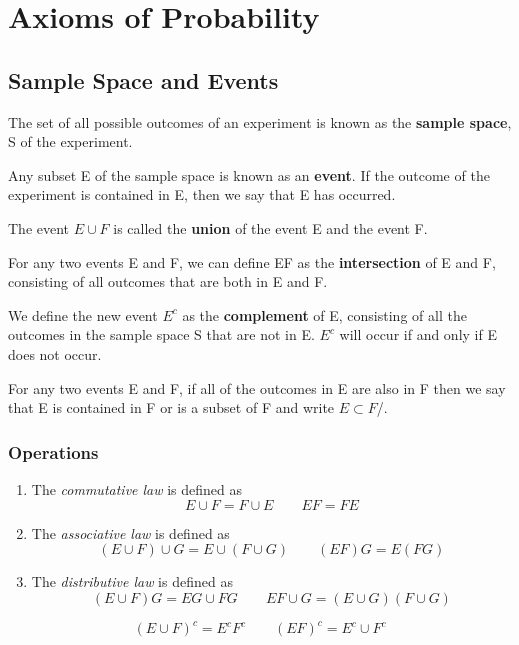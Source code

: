 \setcounter{chapter}{1}
\chapter{Axioms of Probability}
\section{Sample Space and Events}
\begin{definition}
The set of all possible outcomes of an experiment is known as the \textbf{sample space}, S of the experiment.
\end{definition}
\begin{definition}[Event]
Any subset E of the sample space is known as an \textbf{event}. If the outcome of the experiment is contained in E, then we say that E has occurred. 
\end{definition}
\begin{definition}[Union]
The event $E\cup F$ is called the \textbf{union} of the event E and the event F.
\end{definition}
\begin{definition}[Intersection]
    For any two events E and F, we can define EF as the \textbf{intersection} of E and F, consisting of all outcomes that are both in E and F.
\end{definition}
\begin{definition}[Complement]
    We define the new event $E^c$ as the \textbf{complement} of E, consisting of all the outcomes in the sample space S that are not in E. $E^c$ will occur if and only if E does not occur. 
\end{definition}
\begin{definition}
    For any two events E and F, if all of the outcomes in E are also in F then we say that E is contained in F or is a subset of F and write $E\subset F$/.
\end{definition}
\subsection{Operations}
\begin{enumerate}
    \item The \textit{commutative law} is defined as \[E\cup F = F\cup E\qquad EF = FE\]
    \item The \textit{associative law} is defined as \[(E\cup F)\cup G = E\cup (F\cup G)\qquad (EF)G=E(FG)\]
    \item The \textit{distributive law} is defined as \[(E\cup F)G=EG\cup FG\qquad EF\cup G = (E\cup G)(F\cup G)\]
\end{enumerate}
\begin{theorem}
\[(E\cup F)^c = E^cF^c\qquad (EF)^c = E^c\cup F^c\]
\end{theorem}
